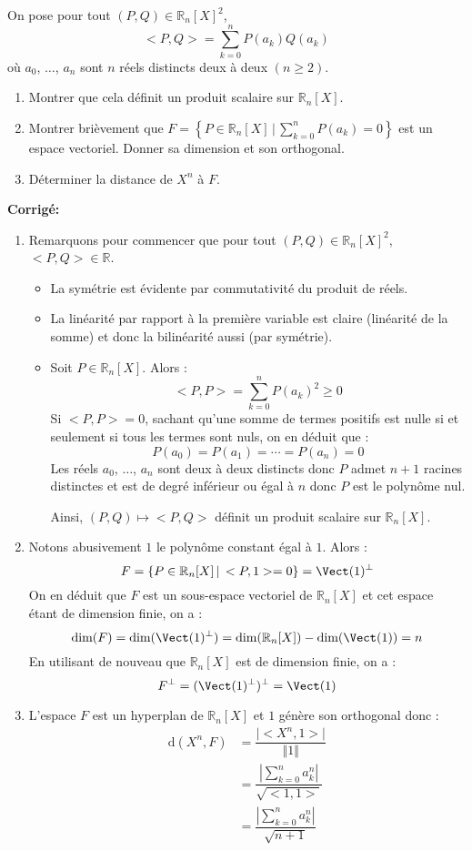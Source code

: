 \documentclass[a4paper,twoside,french,11pt]{VcCours}
\newcommand{\corr}{\textbf{Corrigé:}}
\begin{document}
\begin{Exercice}{} On pose pour tout $(P,Q) \in \mathbb{R}_n[X]^2$,
$$ <P,Q> = \sum_{k=0}^n P(a_k) Q(a_k)$$
où $a_0$, $\ldots$, $a_n$ sont $n$ réels distincts deux à deux $(n \geq 2)$.
\begin{enumerate}
\item Montrer que cela définit un produit scalaire sur $\mathbb{R}_n[X]$.
\item Montrer brièvement que $F= \left\lbrace P \in \mathbb{R}_n[X] \, \vert \, \sum_{k=0}^n P(a_k)=0 \right\rbrace$ est un espace vectoriel. Donner sa dimension et son orthogonal.
\item Déterminer la distance de $X^n$ à $F$.
\end{enumerate}
\end{Exercice}

\corr \begin{enumerate}
\item Remarquons pour commencer que pour tout $(P,Q) \in \mathbb{R}_n[X]^2$, $<P,Q> \in \mathbb{R}$.
\begin{itemize}
\item La symétrie est évidente par commutativité du produit de réels.
\item La linéarité par rapport à la première variable est claire (linéarité de la somme) et donc la bilinéarité aussi (par symétrie).
\item Soit $P \in \mathbb{R}_n[X]$. Alors :
$$ <P,P> =  \sum_{k=0}^n P(a_k)^2 \geq 0$$
Si $<P,P>=0$, sachant qu'une somme de termes positifs est nulle si et seulement si tous les termes sont nuls, on en déduit que :
$$ P(a_0)= P(a_1) = \cdots = P(a_n)=0$$
Les réels $a_0$, $\ldots$, $a_n$ sont deux à deux distincts donc $P$ admet $n+1$ racines distinctes et est de degré inférieur ou égal à $n$ donc $P$ est le polynôme nul.


\noindent Ainsi, $(P,Q) \mapsto <P,Q>$ définit un produit scalaire sur $\mathbb{R}_n[X]$.
\end{itemize}
\item Notons abusivement $1$ le polynôme constant égal à $1$. Alors :
$$ F = \lbrace P \in \mathbb{R}_n[X] \, \vert \, <P,1>= 0 \rbrace = \Vect(1)^{\perp}$$
On en déduit que $F$ est un sous-espace vectoriel de $ \mathbb{R}_n[X]$ et cet espace étant de dimension finie, on a :
$$ \textrm{dim}(F) =  \textrm{dim}(\Vect(1)^{\perp}) =  \textrm{dim}(\mathbb{R}_n[X]) -  \textrm{dim}(\Vect(1)) = n$$
En utilisant de nouveau que $ \mathbb{R}_n[X]$ est de dimension finie, on a :
$$ F^{\perp} = (\Vect(1)^{\perp})^{\perp} = \Vect(1)$$
\item L'espace $F$ est un hyperplan de $\mathbb{R}_n[X]$ et $1$ génère son orthogonal donc :
\begin{align*}
\textrm{d}(X^n, F) & = \dfrac{\vert <X^n,1> \vert}{\Vert 1 \Vert} \\
& = \dfrac{\left\vert \sum_{k=0}^n a_k^n \right\vert }{\sqrt{<1,1>}} \\
& = \dfrac{\left\vert \sum_{k=0}^n a_k^n \right\vert }{\sqrt{n+1}} 
\end{align*}
\end{enumerate}
\end{document}
